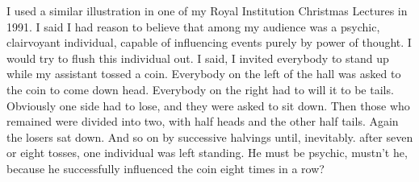 I used a similar illustration in one of my Royal
Institution Christmas Lectures in 1991. I said I had reason
to believe that among my audience was a psychic,
clairvoyant individual, capable of influencing events
purely by power of thought. I would try to flush this
individual out.  I said,
 I invited everybody to
stand up while my assistant tossed a coin. Everybody on the
left of the hall was asked to  the coin to
come down head. Everybody on the right had to will it to be
tails. Obviously one side had to lose, and they were asked
to sit down. Then those who remained were divided into two,
with half  heads and the other half tails.
Again the losers sat down. And so on by successive halvings
until, inevitably. after seven or eight tosses, one
individual was left standing.  He must be psychic, mustn't he,
because he successfully influenced the coin eight times in
a row? 
